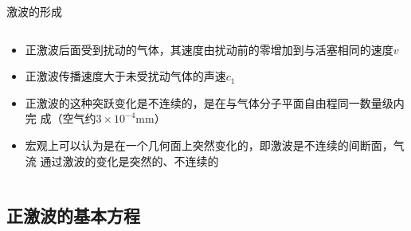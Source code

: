 \begin{frame}{激波的形成}
\begin{columns}[c]
\begin{column}{0.6\textwidth}
{\begin{itemize}[<+(10)->]
    \item 正激波后面受到扰动的气体，其速度由扰动前的零增加到与活塞相同的速度$v$
    \item 正激波传播速度大于未受扰动气体的声速$c_{1}$
    \item 正激波的这种突跃变化是不连续的，是在与气体分子平面自由程同一数量级内完
      成（空气约$3\times10^{-4}\mathrm{mm}$）
    \item 宏观上可以认为是在一个几何面上突然变化的，即激波是不连续的间断面，气流
      通过激波的变化是突然的、不连续的
  \end{itemize}
}
    \end{column}
    
  \end{columns}
\end{frame}

\subsection{正激波的基本方程}

